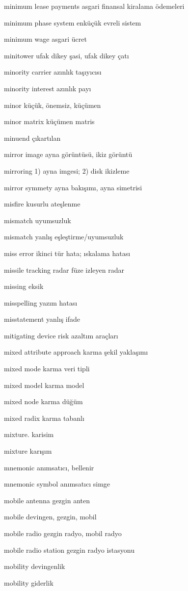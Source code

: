 \documentclass[12pt,fleqn]{article}\usepackage{../../common}
\begin{document}
minimum lease payments asgari finansal kiralama ödemeleri

minimum phase system enküçük evreli sistem

minimum wage asgari ücret

minitower ufak dikey şasi, ufak dikey çatı

minority carrier azınlık taşıyıcısı

minority interest azınlık payı

minor küçük, önemsiz, küçümen

minor matrix küçümen matris

minuend çıkartılan

mirror image ayna görüntüsü, ikiz görüntü

mirroring 1) ayna imgesi; 2) disk ikizleme

mirror symmety ayna bakışımı, ayna simetrisi

misfire kusurlu ateşlenme

mismatch uyumsuzluk

mismatch yanlış eşleştirme/uyumsuzluk

miss error ikinci tür hata; ıskalama hatası

missile tracking radar füze izleyen radar

missing eksik

misspelling yazım hatası

misstatement yanlış ifade

mitigating device risk azaltım araçları

mixed attribute approach karma şekil yaklaşımı

mixed mode karma veri tipli

mixed model karma model

mixed node karma düğüm

mixed radix karma tabanlı

mixture. karisim

mixture karışım

mnemonic anımsatıcı, bellenir

mnemonic symbol anımsatıcı simge

mobile antenna gezgin anten

mobile devingen, gezgin, mobil

mobile radio gezgin radyo, mobil radyo

mobile radio station gezgin radyo istasyonu

mobility devingenlik

mobility giderlik
\end{document}
